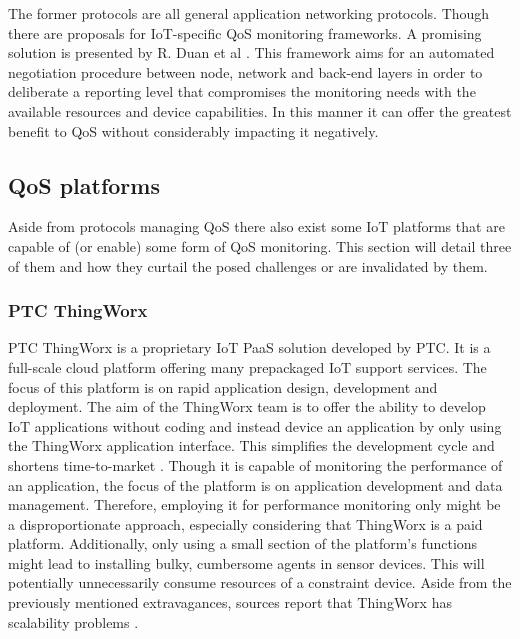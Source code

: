 The former protocols are all general application networking protocols. Though there are proposals for IoT-specific QoS monitoring frameworks. A promising solution is presented by R. Duan et al \cite{qos_extensive_architecture}. This framework aims for an automated negotiation procedure between node, network and back-end layers in order to deliberate a reporting level that compromises the monitoring needs with the available resources and device capabilities. In this manner it can offer the greatest benefit to QoS without considerably impacting it negatively.

\subsection{QoS platforms}
Aside from protocols managing QoS there also exist some IoT platforms that are capable of (or enable) some form of QoS monitoring. This section will detail three of them and how they curtail the posed challenges or are invalidated by them.
\subsubsection*{PTC ThingWorx}
PTC ThingWorx \cite{web:thingworx} is a proprietary IoT PaaS solution developed by PTC. It is a full-scale cloud platform offering many prepackaged IoT support services. The focus of this platform is on rapid application design, development and deployment. The aim of the ThingWorx team is to offer the ability to develop IoT applications without coding and instead device an application by only using the ThingWorx application interface. This simplifies the development cycle and shortens time-to-market \cite{study_of_various}. Though it is capable of monitoring the performance of an application, the focus of the platform is on application development and data management. Therefore, employing it for performance monitoring only might be a disproportionate approach, especially considering that ThingWorx is a paid platform. Additionally, only using a small section of the platform's functions might lead to installing bulky, cumbersome agents in sensor devices. This will potentially unnecessarily consume resources of a constraint device. Aside from the previously mentioned extravagances, sources report that ThingWorx has scalability problems \cite{good_assessment}.%

